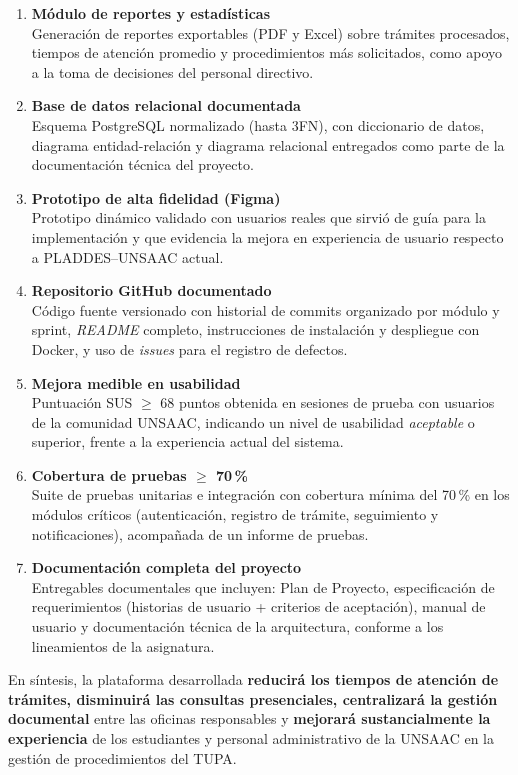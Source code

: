 \begin{enumerate}[label=\textbf{\arabic*.}]
  \item \textbf{Módulo de reportes y estadísticas}\\
    Generación de reportes exportables (PDF y Excel) sobre trámites procesados,
    tiempos de atención promedio y procedimientos más solicitados, como apoyo
    a la toma de decisiones del personal directivo.

  \item \textbf{Base de datos relacional documentada}\\
    Esquema PostgreSQL normalizado (hasta 3FN), con diccionario de datos,
    diagrama entidad-relación y diagrama relacional entregados como parte de la
    documentación técnica del proyecto.

  \item \textbf{Prototipo de alta fidelidad (Figma)}\\
    Prototipo dinámico validado con usuarios reales que sirvió de guía para la
    implementación y que evidencia la mejora en experiencia de usuario respecto
    a PLADDES--UNSAAC actual.

  \item \textbf{Repositorio GitHub documentado}\\
    Código fuente versionado con historial de commits organizado por módulo y
    sprint, \textit{README} completo, instrucciones de instalación y despliegue
    con Docker, y uso de \textit{issues} para el registro de defectos.

  \item \textbf{Mejora medible en usabilidad}\\
    Puntuación SUS $\geq$ 68 puntos obtenida en sesiones de prueba con usuarios
    de la comunidad UNSAAC, indicando un nivel de usabilidad \textit{aceptable}
    o superior, frente a la experiencia actual del sistema.

  \item \textbf{Cobertura de pruebas $\geq$ 70\,\%}\\
    Suite de pruebas unitarias e integración con cobertura mínima del 70\,\% en
    los módulos críticos (autenticación, registro de trámite, seguimiento y
    notificaciones), acompañada de un informe de pruebas.

  \item \textbf{Documentación completa del proyecto}\\
    Entregables documentales que incluyen: Plan de Proyecto, especificación de
    requerimientos (historias de usuario + criterios de aceptación), manual de
    usuario y documentación técnica de la arquitectura, conforme a los
    lineamientos de la asignatura.

\end{enumerate}

\bigskip
En síntesis, la plataforma desarrollada \textbf{reducirá los tiempos de atención
de trámites, disminuirá las consultas presenciales, centralizará la gestión
documental} entre las oficinas responsables y \textbf{mejorará sustancialmente
la experiencia} de los estudiantes y personal administrativo de la UNSAAC en
la gestión de procedimientos del TUPA.